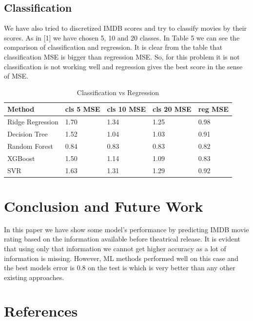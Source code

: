\documentclass{article}
\begin{document}
\subsection{Classification}
We have also tried to discretized IMDB scores and try to classify movies by their scores. As in [1] we have chosen 5, 10  and 20 classes. In Table 5 we can see the comparison of classification and regression. It is clear from the table that classification MSE is bigger than regression MSE. So, for this problem it is not classification is not working well and regression gives the best score in the sense of MSE. 

\begin{table}
  \caption{Classification vs Regression}
  \label{cls_vs_reg}
  \centering
  \begin{tabular}{lllll}
    \toprule
    Method & cls 5 MSE & cls 10 MSE & cls 20 MSE & reg MSE   \\
    \midrule
    Ridge Regression  & 1.70 & 1.34  & 1.25 & 0.98    \\
    Decision Tree & 1.52 & 1.04 & 1.03 & 0.91 \\
    Random Forest & 0.84 & 0.83  & 0.83 & 0.82 \\
    XGBoost   &1.50 & 1.14  & 1.09 & 0.83 \\
    SVR  & 1.63 & 1.31 & 1.29 & 0.92 \\
        \bottomrule
  \end{tabular}
\end{table}



\section{Conclusion and Future Work}

In this paper we have show some model's performance by predicting IMDB movie rating based on the information available before theatrical release. It is evident that using only that information we cannot get higher accuracy as a lot of information is missing. However, ML methods performed well on this case and the best models error is 0.8 on the test is which is very better than any other existing approaches. 

\section*{References}
\label{reference}

\small
\end{document}
